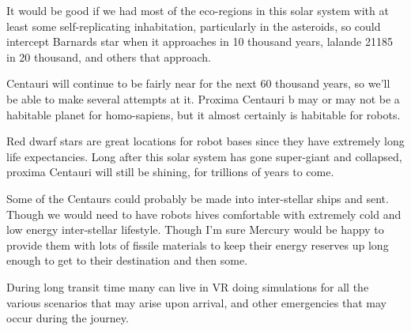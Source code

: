 It would be good if we had most of the eco-regions in this solar system with at
least some self-replicating inhabitation, particularly in the asteroids, so
could intercept Barnards star when it approaches in 10 thousand years, lalande
21185 in 20 thousand, and others that approach. 

Centauri will continue to be fairly near for the next 60 thousand
years, so we'll be able to make several attempts at it.  Proxima Centauri b may
or may not be a habitable planet for homo-sapiens, but it almost certainly is
habitable for robots. 

Red dwarf stars are great locations for robot bases since they have extremely
long life expectancies. Long after this solar system has gone super-giant and
collapsed, proxima Centauri will still be shining, for trillions of
years to come. 


Some of the Centaurs could probably be made into inter-stellar ships and sent.
Though we would need to have robots hives comfortable with extremely cold and
low energy inter-stellar lifestyle. Though I'm sure Mercury would be happy to
provide them with lots of fissile materials to keep their energy reserves up
long enough to get to their destination and then some. 

During long transit time many can live in VR doing simulations for all the
various scenarios that may arise upon arrival, and other emergencies that may
occur during the journey. 

